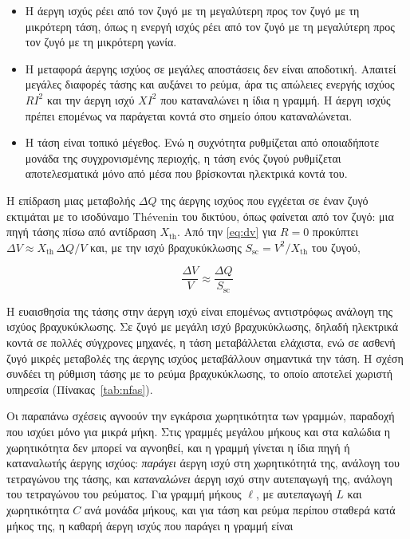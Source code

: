 \begin{itemize}
\item Η άεργη ισχύς ρέει από τον ζυγό με τη μεγαλύτερη προς τον ζυγό με τη μικρότερη τάση,
      όπως η ενεργή ισχύς ρέει από τον ζυγό με τη μεγαλύτερη προς τον ζυγό με τη μικρότερη
      γωνία.
\item Η μεταφορά άεργης ισχύος σε μεγάλες αποστάσεις δεν είναι αποδοτική. Απαιτεί μεγάλες
      διαφορές τάσης και αυξάνει το ρεύμα, άρα τις απώλειες ενεργής ισχύος $RI^2$ και την
      άεργη ισχύ $XI^2$ που καταναλώνει η ίδια η γραμμή. Η άεργη ισχύς πρέπει επομένως να
      παράγεται κοντά στο σημείο όπου καταναλώνεται.
\item Η τάση είναι τοπικό μέγεθος. Ενώ η συχνότητα ρυθμίζεται από οποιαδήποτε μονάδα της
      συγχρονισμένης περιοχής, η τάση ενός ζυγού ρυθμίζεται αποτελεσματικά μόνο από μέσα
      που βρίσκονται ηλεκτρικά κοντά του.
\end{itemize}

Η επίδραση μιας μεταβολής $\Delta Q$ της άεργης ισχύος που εγχέεται σε έναν ζυγό εκτιμάται με
το ισοδύναμο Thévenin του δικτύου, όπως φαίνεται από τον ζυγό: μια πηγή τάσης πίσω από
αντίδραση $X_{\mathrm{th}}$. Από την \eqref{eq:dv} για $R = 0$ προκύπτει
$\Delta V \approx X_{\mathrm{th}}\,\Delta Q / V$ και, με την ισχύ βραχυκύκλωσης
$S_{\mathrm{sc}} = V^2 / X_{\mathrm{th}}$ του ζυγού,

\begin{equation}
\frac{\Delta V}{V} \approx \frac{\Delta Q}{S_{\mathrm{sc}}}
\label{eq:dv-ssc}
\end{equation}

Η ευαισθησία της τάσης στην άεργη ισχύ είναι επομένως αντιστρόφως ανάλογη της ισχύος
βραχυκύκλωσης. Σε ζυγό με μεγάλη ισχύ βραχυκύκλωσης, δηλαδή ηλεκτρικά κοντά σε πολλές
σύγχρονες μηχανές, η τάση μεταβάλλεται ελάχιστα, ενώ σε ασθενή ζυγό μικρές μεταβολές της
άεργης ισχύος μεταβάλλουν σημαντικά την τάση. Η σχέση συνδέει τη ρύθμιση τάσης με το ρεύμα
βραχυκύκλωσης, το οποίο αποτελεί χωριστή υπηρεσία (Πίνακας~\ref{tab:nfas}).

Οι παραπάνω σχέσεις αγνοούν την εγκάρσια χωρητικότητα των γραμμών, παραδοχή που ισχύει μόνο
για μικρά μήκη. Στις γραμμές μεγάλου μήκους και στα καλώδια η χωρητικότητα δεν μπορεί να
αγνοηθεί, και η γραμμή γίνεται η ίδια πηγή ή καταναλωτής άεργης ισχύος: \emph{παράγει} άεργη
ισχύ στη χωρητικότητά της, ανάλογη του τετραγώνου της τάσης, και \emph{καταναλώνει} άεργη ισχύ
στην αυτεπαγωγή της, ανάλογη του τετραγώνου του ρεύματος. Για γραμμή μήκους $\ell$, με
αυτεπαγωγή $L$ και χωρητικότητα $C$ ανά μονάδα μήκους, και για τάση και ρεύμα περίπου σταθερά
κατά μήκος της, η καθαρή άεργη ισχύς που παράγει η γραμμή είναι

